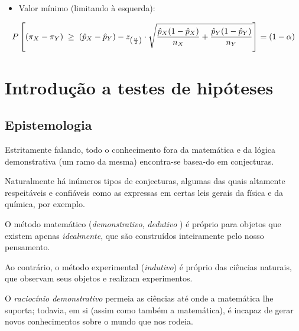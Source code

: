 \documentclass[
]{book}
\providecommand{\tightlist}{%
  \setlength{\itemsep}{0pt}\setlength{\parskip}{0pt}}
\begin{document}
\hfill\break

\begin{itemize}
\tightlist
\item
  Valor mínimo (limitando à esquerda):
\end{itemize}

\hfill\break

\[
P\left[(\pi_{X}-\pi_{Y})  \hspace{0.1cm} \ge \hspace{0.1cm} (\hat{p}_{X}-\hat{p}_{Y}) - {z}_{\left(\frac{\alpha }{2}\right)} \cdot \sqrt{{\frac{\hat{p}_{X}(1-\hat{p}_{X})}{n_{X}}+ \frac{\hat{p}_{Y}(1-\hat{p}_{Y})}{n_{Y}}}}\right] = (1-\alpha)
\]

\hypertarget{teste_hipoteses}{%
\chapter{Introdução a testes de hipóteses}\label{teste_hipoteses}}

\hypertarget{epistemologia}{%
\section{Epistemologia}\label{epistemologia}}

Estritamente falando, todo o conhecimento fora da matemática e da lógica demonstrativa (um ramo da mesma) encontra-se basea-do em conjecturas.

\hfill\break

Naturalmente há inúmeros tipos de conjecturas, algumas das quais altamente respeitáveis e confiáveis como as expressas em certas leis gerais da física e da química, por exemplo.

\hfill\break

O método matemático (\emph{demonstrativo}, \emph{dedutivo} ) é próprio para objetos que existem apenas \emph{idealmente}, que são construídos inteiramente pelo nosso pensamento.

\hfill\break

Ao contrário, o método experimental (\emph{indutivo}) é próprio das ciências naturais, que observam seus objetos e realizam experimentos.

\hfill\break

O \emph{raciocínio demonstrativo} permeia as ciências até onde a matemática lhe suporta; todavia, em si (assim como também a matemática), é incapaz de gerar novos conhecimentos sobre o mundo que nos rodeia.

\hfill\break
\end{document}
